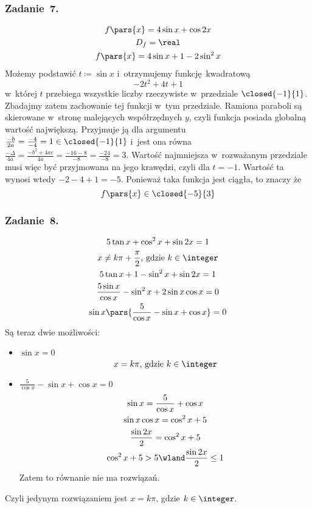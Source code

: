 \subsubsection*{Zadanie~7.}
\begin{gather*}
    f\pars{x} = 4\sin x + \cos2x\\
    D_f = \real\\
    f\pars{x} = 4\sin x + 1 - 2\sin^2x
\end{gather*}
Możemy podstawić \(t \coloneqq \sin x\) i~otrzymujemy funkcję kwadratową
\begin{equation*}
    -2t^2 + 4t + 1
\end{equation*}
w~której \(t\) przebiega wszystkie liczby rzeczywiste w~przedziale \(\closed{-1}{1}\). Zbadajmy zatem zachowanie tej funkcji w~tym przedziale. Ramiona paraboli są skierowane w~stronę malejących współrzędnych \(y\), czyli funkcja posiada globalną wartość największą. Przyjmuje ją dla argumentu \(\frac{-b}{2a} = \frac{-4}{-4} = 1 \in \closed{-1}{1}\) i~jest ona równa \(\frac{-\Delta}{4a} = \frac{-b^2 + 4ac}{4a} = \frac{-16 - 8}{-8} = \frac{-24}{-8} = 3\). Wartość najmniejsza w~rozważanym przedziale musi więc być przyjmowana na jego krawędzi, czyli dla \(t = -1\). Wartość ta wynosi wtedy \(-2 - 4 + 1 = -5\). Ponieważ taka funkcja jest ciągła, to znaczy że
\begin{equation*}
    f\pars{x} \in \closed{-5}{3}
\end{equation*}
\subsubsection*{Zadanie~8.}
\begin{gather*}
    5\tan x + \cos^2x + \sin2x = 1\\
    x \neq k\pi + \frac{\pi}{2} \text{, gdzie \(k \in \integer\)}\\
    5\tan x + 1 - \sin^2x + \sin2x = 1\\
    \frac{5\sin x}{\cos x} - \sin^2x + 2\sin x\cos x = 0\\
    \sin x\pars{\frac{5}{\cos x} - \sin x + \cos x} = 0
\end{gather*}
Są teraz dwie możliwości:
\begin{itemize}
    \item \(\sin x = 0\)
        \begin{equation*}
            x = k\pi \text{, gdzie \(k \in \integer\)}
        \end{equation*}
    \item \(\frac{5}{\cos x} - \sin x + \cos x = 0\)
        \begin{gather*}
            \sin x = \frac{5}{\cos x} + \cos x\\
            \sin x\cos x = \cos^2x + 5\\
            \frac{\sin2x}{2} = \cos^2x + 5\\
            \cos^2x + 5 > 5 \wland \frac{\sin2x}{2} \leq 1
        \end{gather*}
        Zatem to równanie nie ma rozwiązań.
\end{itemize}
Czyli jedynym rozwiązaniem jest \(x = k\pi\), gdzie \(k \in \integer\).
